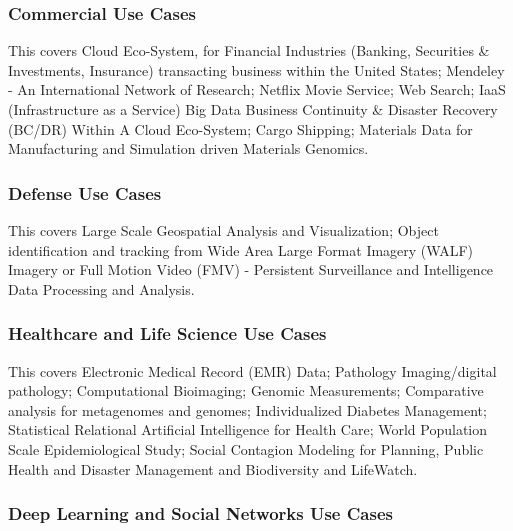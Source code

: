 

\subsubsection{Commercial Use Cases}\label{commercial-use-cases}

This covers Cloud Eco-System, for Financial Industries (Banking,
Securities \& Investments, Insurance) transacting business within the
United States; Mendeley - An International Network of Research; Netflix
Movie Service; Web Search; IaaS (Infrastructure as a Service) Big Data
Business Continuity \& Disaster Recovery (BC/DR) Within A Cloud
Eco-System; Cargo Shipping; Materials Data for Manufacturing and
Simulation driven Materials Genomics.




\subsubsection{Defense Use Cases}\label{defense-use-cases}

This covers Large Scale Geospatial Analysis and Visualization; Object
identification and tracking from Wide Area Large Format Imagery (WALF)
Imagery or Full Motion Video (FMV) - Persistent Surveillance and
Intelligence Data Processing and Analysis.




\subsubsection{Healthcare and Life Science Use
Cases}\label{healthcare-and-life-science-use-cases}

This covers Electronic Medical Record (EMR) Data; Pathology
Imaging/digital pathology; Computational Bioimaging; Genomic
Measurements; Comparative analysis for metagenomes and genomes;
Individualized Diabetes Management; Statistical Relational Artificial
Intelligence for Health Care; World Population Scale Epidemiological
Study; Social Contagion Modeling for Planning, Public Health and
Disaster Management and Biodiversity and LifeWatch.




\subsubsection{Deep Learning and Social Networks Use
Cases}\label{deep-learning-and-social-networks-use-cases}

